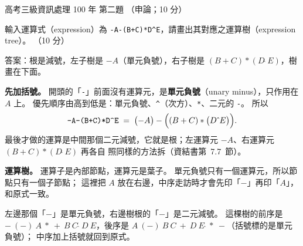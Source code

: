 \begin{pastexam}[label={px:gk3-100-ds-02}]{高考三級資訊處理 100 年 第二題}
（申論；10 分）

輸入運算式（expression）為 \texttt{-A-(B+C)*D\textasciicircum E}，請畫出其對應之運算樹（expression tree）。
（10 分）
\end{pastexam}

\begin{pastsoln}
答案：根是減號，左子樹是 $-A$（單元負號），右子樹是 $(B+C)*(D\,\hat{}\,E)$，樹畫在下面。

\textbf{先加括號。} 開頭的「\texttt{-}」前面沒有運算元，是\textbf{單元負號}（unary minus），只作用在
$A$ 上。 優先順序由高到低是：單元負號、\texttt{\textasciicircum}（次方）、\texttt{*}、二元的
\texttt{-}。 所以
\[
\texttt{-A-(B+C)*D\textasciicircum E} \;=\; \bigl(-A\bigr) - \Bigl( (B + C) * \bigl(D\,\hat{}\,E\bigr) \Bigr).
\]
最後才做的運算是中間那個二元減號，它就是根；左運算元 $-A$、右運算元 $(B+C)*(D\,\hat{}\,E)$ 再各自
照同樣的方法拆（資結書第~7.7~節）。

\textbf{運算樹。} 運算子是內部節點，運算元是葉子。 單元負號只有一個運算元，所以節點只有一個子節點；
這裡把 $A$ 放在右邊，中序走訪時才會先印「$-$」再印「$A$」，和原式一致。
\begin{center}
\end{center}
左邊那個「$-$」是單元負號，右邊樹根的「$-$」是二元減號。 這棵樹的前序是
$-\ (-)\ A\ *\ +\ B\ C\ \hat{}\ D\ E$，後序是 $A\ (-)\ B\ C\ +\ D\ E\ \hat{}\ *\ -$（括號標的是單元負號）；
中序加上括號就回到原式。
\end{pastsoln}
